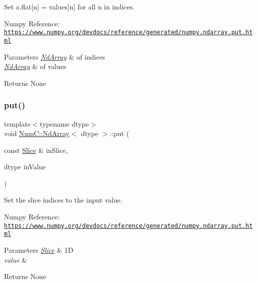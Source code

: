 Set a.\+flat\mbox{[}n\mbox{]} = values\mbox{[}n\mbox{]} for all n in indices.

Numpy Reference\+: \href{https://www.numpy.org/devdocs/reference/generated/numpy.ndarray.put.html}{\tt https\+://www.\+numpy.\+org/devdocs/reference/generated/numpy.\+ndarray.\+put.\+html}


\begin{DoxyParams}{Parameters}
{\em \mbox{\hyperlink{class_num_c_1_1_nd_array}{Nd\+Array}}} & of indices \\
\hline
{\em \mbox{\hyperlink{class_num_c_1_1_nd_array}{Nd\+Array}}} & of values \\
\hline
\end{DoxyParams}
\begin{DoxyReturn}{Returns}
None 
\end{DoxyReturn}
\mbox{\label{class_num_c_1_1_nd_array_a50cae04d1e231ad496053c30f99650e0}} 
\subsubsection{\texorpdfstring{put()}{put()}\hspace{0.1cm}{\footnotesize\ttfamily [5/12]}}
{\footnotesize\ttfamily template$<$typename dtype$>$ \\
void \mbox{\hyperlink{class_num_c_1_1_nd_array}{Num\+C\+::\+Nd\+Array}}$<$ dtype $>$\+::put (\begin{DoxyParamCaption}\item[{const \mbox{\hyperlink{class_num_c_1_1_slice}{Slice}} \&}]{in\+Slice,  }\item[{dtype}]{in\+Value }\end{DoxyParamCaption})\hspace{0.3cm}{\ttfamily [inline]}}

Set the slice indices to the input value.

Numpy Reference\+: \href{https://www.numpy.org/devdocs/reference/generated/numpy.ndarray.put.html}{\tt https\+://www.\+numpy.\+org/devdocs/reference/generated/numpy.\+ndarray.\+put.\+html}


\begin{DoxyParams}{Parameters}
{\em \mbox{\hyperlink{class_num_c_1_1_slice}{Slice}}} & 1D \\
\hline
{\em value} & \\
\hline
\end{DoxyParams}
\begin{DoxyReturn}{Returns}
None 
\end{DoxyReturn}
\mbox{\label{class_num_c_1_1_nd_array_aacf22eb97ab4c78b8fd021baf8d0b144}} 
